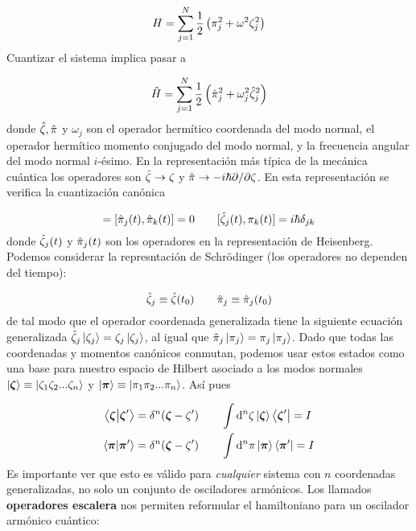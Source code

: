 \begin{equation}
	H=\sum_{j=1}^N \frac{1}{2} \left( \pi_j^2 + \omega^2 \zeta_j^2 \right)
\end{equation}
Cuantizar el sistema implica pasar a 

\begin{equation}
	\hat{H} = \sum_{j=1}^N \frac{1}{2} \left(  \hat{{\pi}}_j^2 + \omega_j^2 \hat{{\zeta}}_j^2 \right)
\end{equation}
donde $\hat{{\zeta}},\hat{{\pi}}$ y $\omega_j$ son el operador hermítico coordenada del modo normal, el operador hermítico momento conjugado del modo normal, y la frecuencia angular del modo normal $i$-ésimo. En la representación más típica de la mecánica cuántica los operadores son $\hat{{\zeta}}\rightarrow\zeta$ y $\hat{{\pi}}\rightarrow-i\hbar\partial/\partial\zeta$. En esta representación se verifica la cuantización canónica 

\begin{equation}
	[\hzeta_j(t),\hzeta_k(t)]=[\hpi_j(t),\hpi_k(t)]=0 \qquad [\hzeta_j(t) ,\pi_k (t) ]=i\hbar \delta_{jk}
\end{equation}
donde $\hat{{\zeta}}_j(t)$ y $\hat{{\pi}}_j(t)$ son los operadores en la representación de Heisenberg. Podemos considerar la represntación de Schrödinger (los operadores no dependen del tiempo):

\begin{equation}
	\hat{{\zeta}}_j \equiv \hat{{\zeta}}(t_0) \qquad 	\hat{{\pi}}_j \equiv \hat{{\pi}}_j(t_0)
\end{equation}
de tal modo que el operador coordenada generalizada tiene la siguiente ecuación generalizada $\hat{{\zeta}}_j \ket{\zeta_j}=\zeta_j \ket{\zeta_j}$, al igual que $\hat{{\pi}}_j \ket{\pi_j}=\pi_j \ket{\pi_j}$. Dado que todas las coordenadas y momentos canónicos conmutan, podemos usar estos estados como una base para nuestro espacio de Hilbert asociado a los modos normales $\ket{\boldsymbol{\zeta}}\equiv \ket{\zeta_1\zeta_2...\zeta_n}$ y $\ket{\boldsymbol{\pi}}\equiv \ket{\pi_1\pi_2...\pi_n}$. Así pues

\begin{equation}
	\begin{split}
		\braket{\boldsymbol{\zeta}}{\boldsymbol{\zeta}'}=\delta^n (\boldsymbol{\zeta}-\zeta') & \qquad \int\mathrm{d}^n \zeta \ket{\boldsymbol{\zeta}}\bra{\boldsymbol{\zeta}'} = I  \\
		\braket{\boldsymbol{\pi}}{\boldsymbol{\pi}'}=\delta^n (\boldsymbol{\zeta}-\zeta') & \qquad \int\mathrm{d}^n \pi \ket{\boldsymbol{\pi}}\bra{\boldsymbol{\pi}'} = I  \\
	\end{split}
\end{equation}
Es importante ver que esto es válido para \textit{cualquier} sistema con $n$ coordenadas generalizadas, no solo un conjunto de osciladores armónicos. Los llamados \textbf{operadores escalera} nos permiten reformular el hamiltoniano para un oscilador armónico cuántico:


